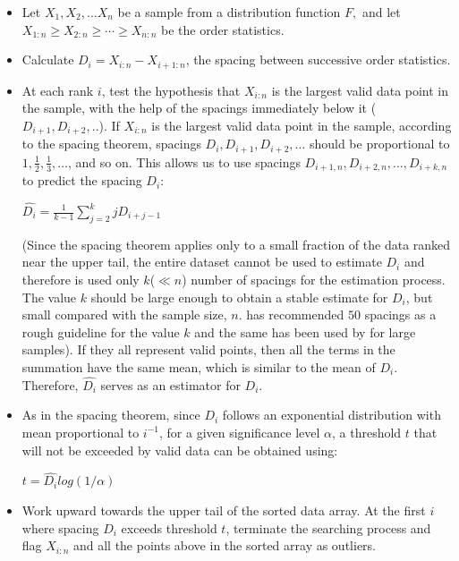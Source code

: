 \documentclass{monashthesis}
\theoremstyle{definition}
\theoremstyle{definition}
\theoremstyle{definition}
\theoremstyle{remark}
\begin{document}
\begin{itemize}
\tightlist
\item
  Let \(X_{1},X_{2},\dots X_{n}\) be a sample from a distribution function \(F,\) and let \(X_{1:n}\geqslant X_{2:n}\geqslant \cdots \geqslant X_{n:n}\) be the order statistics.
\item
  Calculate \(D_{i} = X_{i:n} - X_{i+1:n}\), the spacing between successive order statistics.
\item
  At each rank \(i\), test the hypothesis that \(X_{i:n}\) is the largest valid data point in the sample, with the help of the spacings immediately below it (\(D_{i+1}, D_{i+2},..\)). If \(X_{i:n}\) is the largest valid data point in the sample, according to the spacing theorem, spacings \(D_{i}, D_{i+1}, D_{i+2},\dots\) should be proportional to \(1, \frac{1 }{2}, \frac{1 }{3},\dots\), and so on. This allows us to use spacings \(D_{i+1,n},D_{i+2,n}, \dots,D_{i+k,n}\) to predict the spacing \(D_{i}\):

  \begin{center}
            $\hat{D_{i}}=\frac{1}{k-1}\sum_{j=2}^{k}jD_{i+j-1}$
        \end{center}

  (Since the spacing theorem applies only to a small fraction of the data ranked near the upper tail, the entire dataset cannot be used to estimate \(D_{i}\) and therefore is used only \(k\)(\(\ll n\)) number of spacings for the estimation process. The value \(k\) should be large enough to obtain a stable estimate for \(D_{i}\), but small compared with the sample size, \(n\). \textcite{schwarz2008wind} has recommended \(50\) spacings as a rough guideline for the value \(k\) and the same has been used by \textcite{wilkinsonvisualizing} for large samples). If they all represent valid points, then all the terms in the summation have the same mean, which is similar to the mean of \(D_{i}\). Therefore, \(\hat{D_{i}}\) serves as an estimator for \(D_{i}\).
\item
  As in the spacing theorem, since \(D_{i}\) follows an exponential distribution with mean proportional to \(i^{-1}\), for a given significance level \(\alpha\), a threshold \(t\) that will not be exceeded by valid data can be obtained using:

  \begin{center}
            $t=\hat{D_{i}}log(1/ \alpha)$
        \end{center}
\item
  Work upward towards the upper tail of the sorted data array. At the first \(i\) where spacing \(D_{i}\) exceeds threshold \(t\), terminate the searching process and flag \(X_{i:n}\) and all the points above in the sorted array as outliers.
\end{itemize}
\end{document}
